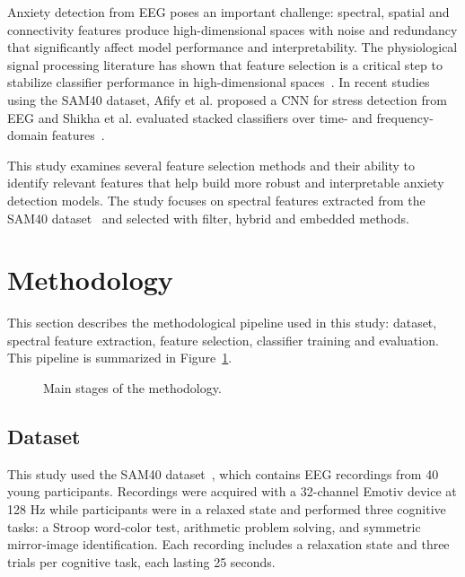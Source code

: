 \documentclass[lettersize,journal]{IEEEtran}
\begin{document}
Anxiety detection from EEG poses an important challenge: spectral, spatial and connectivity features produce high-dimensional spaces with noise and redundancy that significantly affect model performance and interpretability. The physiological signal processing literature has shown that feature selection is a critical step to stabilize classifier performance in high-dimensional spaces~\cite{Acharya2014}. In recent studies using the SAM40 dataset, Afify et al. proposed a CNN for stress detection from EEG and Shikha et al. evaluated stacked classifiers over time- and frequency-domain features~\cite{Afify2025,Shikha2025}.

This study examines several feature selection methods and their ability to identify relevant features that help build more robust and interpretable anxiety detection models. The study focuses on spectral features extracted from the SAM40 dataset~\cite{SAM40Figshare2021} and selected with filter, hybrid and embedded methods.

\section{Methodology}
This section describes the methodological pipeline used in this study: dataset, spectral feature extraction, feature selection, classifier training and evaluation. This pipeline is summarized in Figure~\ref{fig:flujo_metodologia}.

\begin{figure}[H]
	\centering
	\caption{Main stages of the methodology.\label{fig:flujo_metodologia}}
\end{figure}

\subsection{Dataset}
This study used the SAM40 dataset~\cite{SAM40Figshare2021}, which contains EEG recordings from 40 young participants. Recordings were acquired with a 32-channel Emotiv device at 128 Hz while participants were in a relaxed state and performed three cognitive tasks: a Stroop word-color test, arithmetic problem solving, and symmetric mirror-image identification. Each recording includes a relaxation state and three trials per cognitive task, each lasting 25 seconds.
\end{document}
